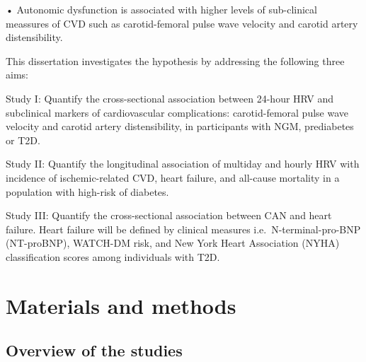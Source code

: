 \documentclass[
  a4paper,
  headsepline=true,
  open=left]{scrbook}
\begin{document}
• Autonomic dysfunction is associated with higher levels of sub-clinical
meassures of CVD such as carotid-femoral pulse wave velocity and carotid
artery distensibility.

This dissertation investigates the hypothesis by addressing the
following three aims:

Study I: Quantify the cross-sectional association between 24-hour HRV
and subclinical markers of cardiovascular complications: carotid-femoral
pulse wave velocity and carotid artery distensibility, in participants
with NGM, prediabetes or T2D.

Study II: Quantify the longitudinal association of multiday and hourly
HRV with incidence of ischemic-related CVD, heart failure, and all-cause
mortality in a population with high-risk of diabetes.

Study III: Quantify the cross-sectional association between CAN and
heart failure. Heart failure will be defined by clinical measures
i.e.~N-terminal-pro-BNP (NT-proBNP), WATCH-DM risk, and New York Heart
Association (NYHA) classification scores among individuals with T2D.

\clearpage
\null
\thispagestyle{empty}
\clearpage


\hypertarget{materials-and-methods}{%
\chapter{Materials and methods}\label{materials-and-methods}}

\clearpage
\null
\thispagestyle{empty}
\clearpage

\hypertarget{overview-of-the-studies}{%
\section{Overview of the studies}\label{overview-of-the-studies}}
\end{document}
